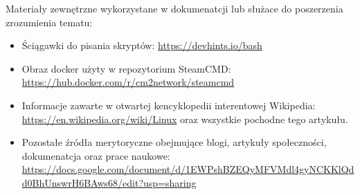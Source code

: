 \documentclass[10pt,a4paper]{report}
\begin{document}
Materiały zewnętrzne wykorzystane w dokumenatcji lub służace do poszerzenia zrozumienia tematu: 
\begin{itemize}
\item Ściągawki do pisania skryptów: \url{https://devhints.io/bash}
\item Obraz docker użyty w repozytorium SteamCMD: \url{https://hub.docker.com/r/cm2network/steamcmd}
\item Informacje zawarte w otwartej kencyklopedii interentowej Wikipedia: \url{https://en.wikipedia.org/wiki/Linux} oraz wszystkie pochodne tego artykułu.
\item Pozostałe źródła merytoryczne obejmujące blogi, artykuły społeczności, dokumenatcja oraz prace naukowe: \\
\url{https://docs.google.com/document/d/1EWPshBZEQyMFVMdl4gyNCKKlQdd0BhUnswrH6BAws68/edit?usp=sharing}
\end{itemize}
\end{document}
